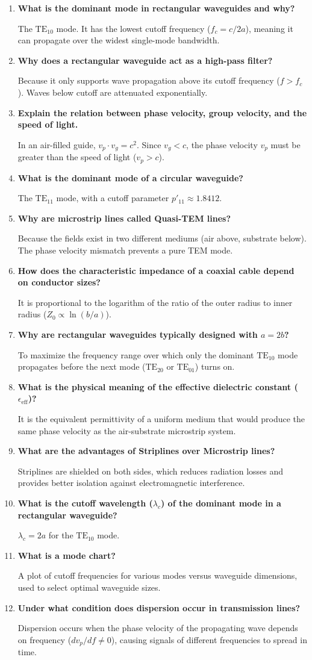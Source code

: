 \documentclass[12pt,a4paper]{article}
\newcommand{\Q}[1]{\textbf{#1}\par\noindent\ignorespaces}
\begin{document}
\begin{tcolorbox}[exambox, title={\textbf{Frequently Asked / Viva Questions}}]
\begin{enumerate}[topsep=0pt, label=\textbf{Q\arabic*.}, itemsep=5pt]
  \item \Q{What is the dominant mode in rectangular waveguides and why?}
    The $\text{TE}_{10}$ mode. It has the lowest cutoff frequency ($f_c = c/2a$), meaning it can propagate over the widest single-mode bandwidth.
  \item \Q{Why does a rectangular waveguide act as a high-pass filter?}
    Because it only supports wave propagation above its cutoff frequency ($f > f_c$). Waves below cutoff are attenuated exponentially.
  \item \Q{Explain the relation between phase velocity, group velocity, and the speed of light.}
    In an air-filled guide, $v_p \cdot v_g = c^2$. Since $v_g < c$, the phase velocity $v_p$ must be greater than the speed of light ($v_p > c$).
  \item \Q{What is the dominant mode of a circular waveguide?}
    The $\text{TE}_{11}$ mode, with a cutoff parameter $p'_{11} \approx 1.8412$.
  \item \Q{Why are microstrip lines called Quasi-TEM lines?}
    Because the fields exist in two different mediums (air above, substrate below). The phase velocity mismatch prevents a pure TEM mode.
  \item \Q{How does the characteristic impedance of a coaxial cable depend on conductor sizes?}
    It is proportional to the logarithm of the ratio of the outer radius to inner radius ($Z_0 \propto \ln(b/a)$).
  \item \Q{Why are rectangular waveguides typically designed with $a = 2b$?}
    To maximize the frequency range over which only the dominant $\text{TE}_{10}$ mode propagates before the next mode ($\text{TE}_{20}$ or $\text{TE}_{01}$) turns on.
  \item \Q{What is the physical meaning of the effective dielectric constant ($\epsilon_{\text{eff}}$)?}
    It is the equivalent permittivity of a uniform medium that would produce the same phase velocity as the air-substrate microstrip system.
  \item \Q{What are the advantages of Striplines over Microstrip lines?}
    Striplines are shielded on both sides, which reduces radiation losses and provides better isolation against electromagnetic interference.
  \item \Q{What is the cutoff wavelength ($\lambda_c$) of the dominant mode in a rectangular waveguide?}
    $\lambda_c = 2a$ for the $\text{TE}_{10}$ mode.
  \item \Q{What is a mode chart?}
    A plot of cutoff frequencies for various modes versus waveguide dimensions, used to select optimal waveguide sizes.
  \item \Q{Under what condition does dispersion occur in transmission lines?}
    Dispersion occurs when the phase velocity of the propagating wave depends on frequency ($dv_p/df \ne 0$), causing signals of different frequencies to spread in time.
\end{enumerate}
\end{tcolorbox}
\end{document}

